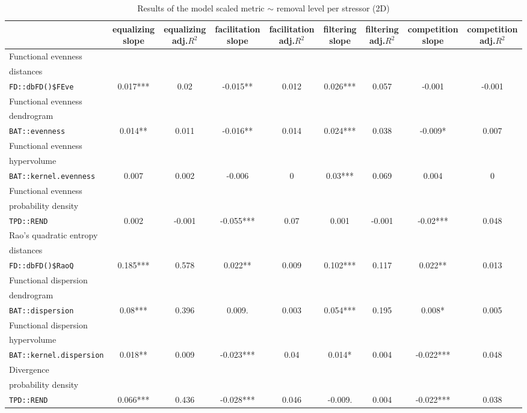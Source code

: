 \documentclass[12pt,letterpaper]{article}
\begin{document}
\begin{landscape}
\begin{table}
\scriptsize
\caption{Results of the model scaled metric $\sim$ removal level per stressor (2D)}
\centering
\begin{tabular}[t]{l|c|c|c|c|c|c|c|c}
\hline
  & equalizing slope & equalizing adj.$R^{2}$ & facilitation slope & facilitation adj.$R^{2}$ & filtering slope & filtering adj.$R^{2}$ & competition slope & competition adj.$R^{2}$\\
\hline
Functional evenness\\distances\\ \texttt{FD::dbFD()\$FEve} & 0.017*** & 0.02 & -0.015** & 0.012 & 0.026*** & 0.057 & -0.001 & -0.001\\
\hline
Functional evenness\\dendrogram\\ \texttt{BAT::evenness} & 0.014** & 0.011 & -0.016** & 0.014 & 0.024*** & 0.038 & -0.009* & 0.007\\
\hline
Functional evenness\\hypervolume\\ \texttt{BAT::kernel.evenness} & 0.007 & 0.002 & -0.006 & 0 & 0.03*** & 0.069 & 0.004 & 0\\
\hline
Functional evenness\\probability density\\ \texttt{TPD::REND} & 0.002 & -0.001 & -0.055*** & 0.07 & 0.001 & -0.001 & -0.02*** & 0.048\\
\hline
Rao's quadratic entropy\\distances\\ \texttt{FD::dbFD()\$RaoQ} & 0.185*** & 0.578 & 0.022** & 0.009 & 0.102*** & 0.117 & 0.022** & 0.013\\
\hline
Functional dispersion\\dendrogram\\ \texttt{BAT::dispersion} & 0.08*** & 0.396 & 0.009. & 0.003 & 0.054*** & 0.195 & 0.008* & 0.005\\
\hline
Functional dispersion\\hypervolume\\ \texttt{BAT::kernel.dispersion} & 0.018** & 0.009 & -0.023*** & 0.04 & 0.014* & 0.004 & -0.022*** & 0.048\\
\hline
Divergence\\probability density\\ \texttt{TPD::REND} & 0.066*** & 0.436 & -0.028*** & 0.046 & -0.009. & 0.004 & -0.022*** & 0.038\\

\end{tabular}
\end{table}
\end{landscape}
\end{document}
